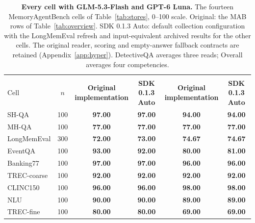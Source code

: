 \documentclass{article}
\newcommand{\tabfont}{\fontsize{7.5}{8.5}\selectfont\renewcommand{\arraystretch}{1.0}}
\begin{document}
\begin{table}[!htbp]
\centering\tabfont
\caption{\textbf{Every cell with GLM-5.3-Flash and GPT-6 Luna.} The fourteen MemoryAgentBench cells of Table~\ref{tab:stores}, 0--100 scale. Original: the MAB rows of Table~\ref{tab:overview}. SDK 0.1.3 Auto: default collection configuration with the LongMemEval refresh and input-equivalent archived results for the other cells. The original reader, scoring and empty-answer fallback contracts are retained (Appendix~\ref{app:hyper}). DetectiveQA averages three reads; Overall averages four competencies.}
\label{tab:expandedfrontier}
\setlength{\tabcolsep}{4pt}\setlength{\aboverulesep}{0pt}\setlength{\belowrulesep}{0pt}\setlength{\extrarowheight}{0.8pt}
\begin{tabular}{lc>{\columncolor{oursbg}}c>{\columncolor{oursbg}}c>{\columncolor{oursbg}}c>{\columncolor{oursbg}}c}
\toprule
 & & \multicolumn{2}{>{\columncolor{oursbg}}c}{GLM-5.3-Flash} & \multicolumn{2}{>{\columncolor{oursbg}}c}{GPT-6 Luna} \\
\cmidrule(lr){3-4}\cmidrule(lr){5-6}
Cell & $n$ & \shortstack{\textbf{Original}\\\textbf{implementation}} & \shortstack{\textbf{SDK 0.1.3}\\\textbf{Auto}} & \shortstack{\textbf{Original}\\\textbf{implementation}} & \shortstack{\textbf{SDK 0.1.3}\\\textbf{Auto}} \\
\midrule
SH-QA & 100 & \textbf{97.00} & \textbf{97.00} & \textbf{94.00} & \textbf{94.00} \\
MH-QA & 100 & \textbf{77.00} & \textbf{77.00} & \textbf{77.00} & \textbf{77.00} \\
LongMemEval & 300 & \textbf{72.00} & \textbf{73.00} & \textbf{74.67} & \textbf{74.67} \\
EventQA & 100 & \textbf{93.00} & \textbf{92.00} & \textbf{80.00} & \textbf{81.00} \\
Banking77 & 100 & \textbf{97.00} & \textbf{97.00} & \textbf{96.00} & \textbf{96.00} \\
TREC-coarse & 100 & \textbf{92.00} & \textbf{92.00} & \textbf{92.00} & \textbf{92.00} \\
CLINC150 & 100 & \textbf{96.00} & \textbf{96.00} & \textbf{98.00} & \textbf{98.00} \\
NLU & 100 & \textbf{90.00} & \textbf{90.00} & \textbf{89.00} & \textbf{89.00} \\
TREC-fine & 100 & \textbf{80.00} & \textbf{80.00} & \textbf{69.00} & \textbf{69.00} \\

\end{tabular}
\end{table}
\end{document}

